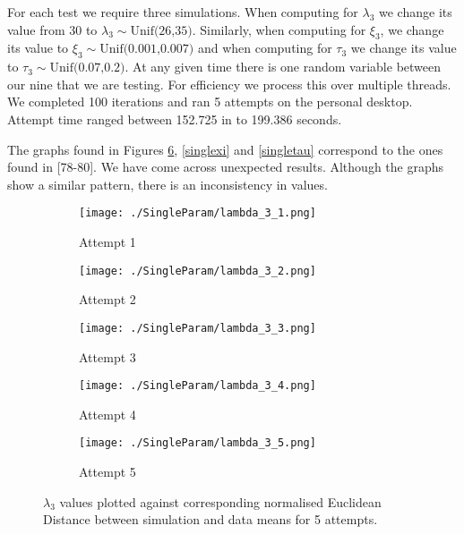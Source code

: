         For each test we require three simulations. When computing for $\lambda_3$ we change its value from 30 to $\lambda_3 \sim \text{Unif(26,35)}$. Similarly, when computing for $\xi_3$, we change its value to $\xi_3 \sim \text{Unif(0.001,0.007)}$ and when computing for $\tau_3$ we change its value to $\tau_3 \sim \text{Unif(0.07,0.2)}$. At any given time there is one random variable between our nine that we are testing. For efficiency we process this over multiple threads. We completed 100 iterations and ran 5 attempts on the personal desktop. Attempt time ranged between 152.725 in to 199.386 seconds.

        The graphs found in Figures \ref{singlelam}, \ref{singlexi} and \ref{singletau} correspond to the ones found in \cite{Grando2019}[78-80]. We have come across unexpected results. Although the graphs show a similar pattern, there is an inconsistency in values. 


        \begin{figure}
            \begin{subfigure}{.3\textwidth}
            \centering
            \texttt{[image: ./SingleParam/lambda\_3\_1.png]}
            \caption{Attempt 1}
            \label{singlelam:1}
            \end{subfigure}
            \begin{subfigure}{.3\textwidth}
            \centering
            \texttt{[image: ./SingleParam/lambda\_3\_2.png]}
            \caption{Attempt 2}
            \label{singlelam:2}
            \end{subfigure}
            \begin{subfigure}{.3\textwidth}
                \centering
                \texttt{[image: ./SingleParam/lambda\_3\_3.png]}
                \caption{Attempt 3}
                \label{singlelam:3}
            \end{subfigure}

            \centering
            \begin{subfigure}{.3\textwidth} 
                \centering
                \texttt{[image: ./SingleParam/lambda\_3\_4.png]}
                \caption{Attempt 4}
                \label{singlelam:4}
            \end{subfigure}
            \begin{subfigure}{.3\textwidth}
                \centering
                \texttt{[image: ./SingleParam/lambda\_3\_5.png]}
                \caption{Attempt 5}
                \label{singlelam:5}
            \end{subfigure}

            \caption{$\lambda_3$ values plotted against corresponding normalised Euclidean Distance between simulation and data means for 5 attempts.}
            \label{singlelam}
        \end{figure}

